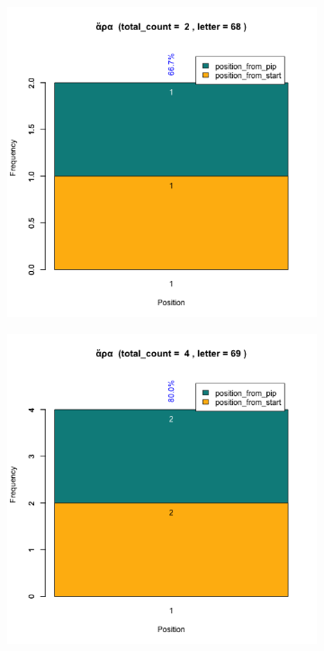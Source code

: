 \documentclass[a4paper]{article}
\begin{document}
\begin{figure}
\begin{subfigure}{0.45\textwidth}
\end{subfigure}
\begin{subfigure}{0.45\textwidth}
\centering
\includegraphics[width=1\linewidth]{../../data/output/paul_R_par/plots/par13_lt68.png}
\end{subfigure}
\begin{subfigure}{0.45\textwidth}
\centering
\includegraphics[width=1\linewidth]{../../data/output/paul_R_par/plots/par13_lt69.png}

\end{subfigure}
\end{figure}
\end{document}
